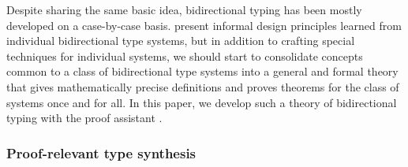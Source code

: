 
Despite sharing the same basic idea, bidirectional typing has been mostly developed on a case-by-case basis.
\citeauthor{Dunfield2021} present informal design principles learned from individual bidirectional type systems, but in addition to crafting special techniques for individual systems, we should start to consolidate concepts common to a class of bidirectional type systems into a general and formal theory that gives mathematically precise definitions and proves theorems for the class of systems once and for all.
In this paper, we develop such a theory of bidirectional typing with the proof assistant \Agda.

\subsubsection{Proof-relevant type synthesis}
\label{sec:PLFA}

